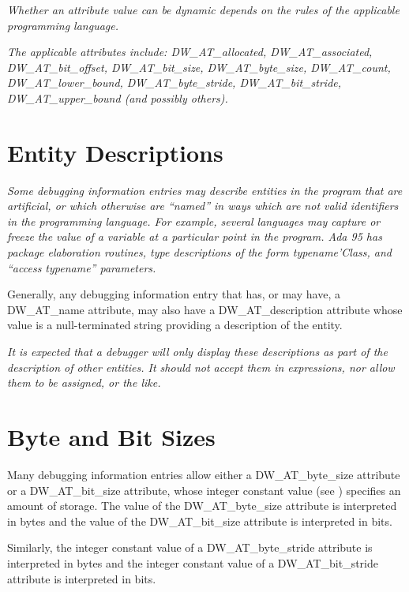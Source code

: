 \textit{
Whether an attribute value can be dynamic depends on the
rules of the applicable programming language.
}

\textit{The applicable attributes include: 
DW\-\_AT\-\_allocated,
DW\-\_AT\-\_associated, 
DW\-\_AT\-\_bit\-\_offset, 
DW\-\_AT\-\_bit\-\_size,
DW\-\_AT\-\_byte\-\_size, 
DW\-\_AT\-\_count, 
DW\-\_AT\-\_lower\-\_bound,
DW\-\_AT\-\_byte\-\_stride, 
DW\-\_AT\-\_bit\-\_stride, 
DW\-\_AT\-\_upper\-\_bound (and
possibly others).}


\section{Entity Descriptions}
\textit{Some debugging information entries may describe entities
in the program that are artificial, or which otherwise are
``named'' in ways which are not valid identifiers in the
programming language. For example, several languages may
capture or freeze the value of a variable at a particular
point in the program. Ada 95 has package elaboration routines,
type descriptions of the form typename’Class, and 
``access typename'' parameters.  }

Generally, any debugging information
entry that has, or may have, a DW\_AT\_name attribute, may
also have a DW\_AT\_description attribute whose value is a
null-terminated string providing a description of the entity.


\textit{It is expected that a debugger will only display these
descriptions as part of the description of other entities. It
should not accept them in expressions, nor allow them to be
assigned, or the like.}

\section{Byte and Bit Sizes}
\label{chap:byteandbitsizes}
Many debugging information entries allow either a
DW\-\_AT\-\_byte\-\_size attribute or a DW\-\_AT\-\_bit\-\_size attribute,
whose integer constant value 
(see ) 
specifies an
amount of storage. The value of the DW\_AT\_byte\_size attribute
is interpreted in bytes and the value of the DW\_AT\_bit\_size
attribute is interpreted in bits.  

Similarly, the integer
constant value of a DW\_AT\_byte\_stride attribute is interpreted
in bytes and the integer constant value of a DW\_AT\_bit\_stride
attribute is interpreted in bits.

